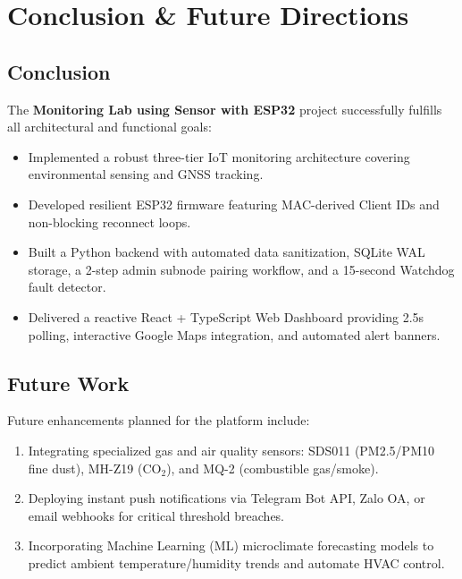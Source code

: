 \documentclass[11pt,a4paper]{article}
\begin{document}
\section{Conclusion \& Future Directions}

\subsection{Conclusion}
The \textbf{Monitoring Lab using Sensor with ESP32} project successfully fulfills all architectural and functional goals:
\begin{itemize}
    \item Implemented a robust three-tier IoT monitoring architecture covering environmental sensing and GNSS tracking.
    \item Developed resilient ESP32 firmware featuring MAC-derived Client IDs and non-blocking reconnect loops.
    \item Built a Python backend with automated data sanitization, SQLite WAL storage, a 2-step admin subnode pairing workflow, and a 15-second Watchdog fault detector.
    \item Delivered a reactive React + TypeScript Web Dashboard providing 2.5s polling, interactive Google Maps integration, and automated alert banners.
\end{itemize}

\subsection{Future Work}
Future enhancements planned for the platform include:
\begin{enumerate}
    \item Integrating specialized gas and air quality sensors: SDS011 (PM2.5/PM10 fine dust), MH-Z19 ($\text{CO}_2$), and MQ-2 (combustible gas/smoke).
    \item Deploying instant push notifications via Telegram Bot API, Zalo OA, or email webhooks for critical threshold breaches.
    \item Incorporating Machine Learning (ML) microclimate forecasting models to predict ambient temperature/humidity trends and automate HVAC control.
\end{enumerate}
\end{document}
